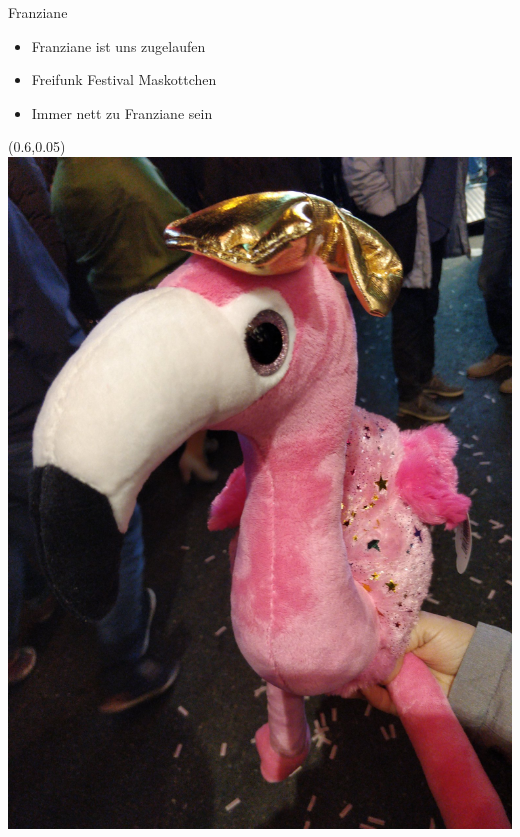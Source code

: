 \begin{frame}{Franziane}
    \begin{itemize}
        \item Franziane ist uns zugelaufen
        \item Freifunk Festival Maskottchen
        \item Immer nett zu Franziane sein
    \end{itemize}
    \begin{textblock*}{0.4\textwidth}(0.6\textwidth,0.05\textheight)
        \includegraphics[keepaspectratio,height=\textheight]{img/franziane}
    \end{textblock*}
\end{frame}

